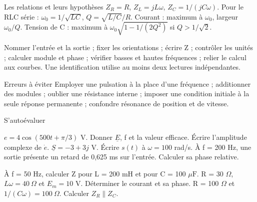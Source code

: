 \begin{loi}{Les relations et leurs hypothèses}
$Z_R=R$, $Z_L=jL\omega$, $Z_C=1/(jC\omega)$. Pour le RLC série : $\omega_0=1/\sqrt{LC}$, $Q=\sqrt{L/C}/R$. Courant : maximum à $\omega_0$, largeur $\omega_0/Q$. Tension de C : maximum à $\omega_0\sqrt{1-1/(2Q^2)}$ si $Q>1/\sqrt2$.
\end{loi}
Nommer l’entrée et la sortie ; fixer les orientations ; écrire Z ; contrôler les unités ; calculer module et phase ; vérifier basses et hautes fréquences ; relier le calcul aux courbes. Une identification utilise au moins deux lectures indépendantes.
\begin{piege}{Erreurs à éviter}
Employer une pulsation à la place d’une fréquence ; additionner des modules ; oublier une résistance interne ; imposer une condition initiale à la seule réponse permanente ; confondre résonance de position et de vitesse.
\end{piege}
\begin{docu}{S’autoévaluer}
\end{docu}


$e=4\cos(500t+\pi/3)$ V. Donner $\underline E$, f et la valeur efficace. Écrire l’amplitude complexe de $\dot e$.
$\underline S=-3+3j$ V. Écrire $s(t)$ à $\omega=100$ rad/s.
À f = 200 Hz, une sortie présente un retard de 0,625 ms sur l’entrée. Calculer sa phase relative.


À f = 50 Hz, calculer Z pour L = 200 mH et pour C = 100 $\mu\mathrm F$.
R = 30 $\Omega$, $L\omega=40\ \Omega$ et $E_m=10$ V. Déterminer le courant et sa phase.
R = 100 $\Omega$ et $1/(C\omega)=100\ \Omega$. Calculer $Z_R\parallel Z_C$.


